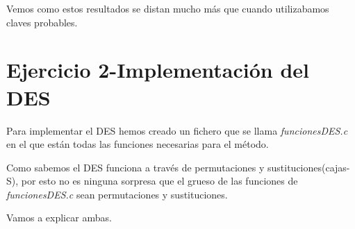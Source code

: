\documentclass{apuntes}
\begin{document}
Vemos como estos resultados se distan mucho más que cuando utilizabamos claves probables.


\section{Ejercicio 2-Implementación del DES}

Para implementar el DES hemos creado un fichero que se llama \textit{funcionesDES.c} en el que están todas las funciones necesarias para el método.

Como sabemos el DES funciona a través de permutaciones y sustituciones(cajas-S), por esto no es ninguna sorpresa que el grueso de las funciones de \textit{funcionesDES.c} sean permutaciones y sustituciones.

Vamos a explicar ambas.
\end{document}
